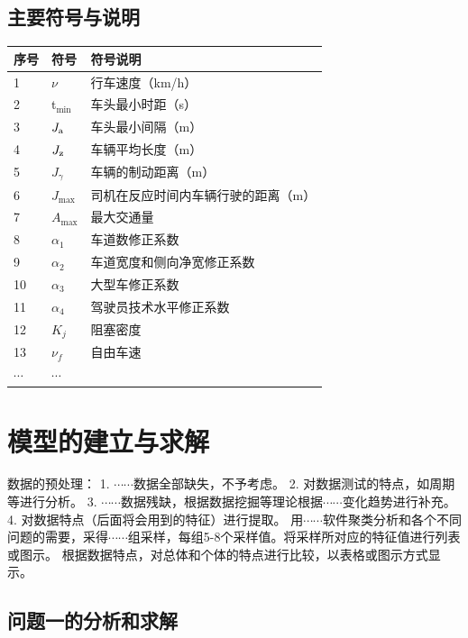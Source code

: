 \documentclass[a4paper]{nmmcm}
\newcommand{\headcol}{\rowcolor{tableheadcolor}}
\begin{document}
\subsection{主要符号与说明}

\begin{table}[h!]
  \centering
  \small
  \begin{tabular}{p{60pt}<{\centering}|p{60pt}<{\centering}p{180pt}<{\raggedright}}
   \hline
   \headcol 序号 & 符号 & 符号说明 \\
   \hline
    1 & $\nu$ & 行车速度（km/h） \\
    2 & t$_{\min}$ & 车头最小时距（s） \\
    3 & $J_{\rm a}$ & 车头最小间隔（m） \\
    4 & $J_{\rm z}$ & 车辆平均长度（m） \\
    5 & $J_{\gamma}$ & 车辆的制动距离（m） \\
    6 & $J_{\max}$ & 司机在反应时间内车辆行驶的距离（m） \\
    7 & $A_{\max}$ & 最大交通量 \\
    8 & $\alpha_{1}$ & 车道数修正系数 \\
    9 & $\alpha_{2}$ & 车道宽度和侧向净宽修正系数 \\
    10 & $\alpha_{3}$ & 大型车修正系数 \\
    11 & $\alpha_{4}$ & 驾驶员技术水平修正系数 \\
    12 & $K_{j}$ & 阻塞密度 \\
    13 & $\nu_{f}$ & 自由车速 \\
    $\cdots$ & $\cdots$\\
    \hline
  \end{tabular}
  \label{symbol}
\end{table}

\section{模型的建立与求解}

数据的预处理：
1. $\cdots\cdots$数据全部缺失，不予考虑。
2. 对数据测试的特点，如周期等进行分析。
3. $\cdots\cdots$数据残缺，根据数据挖掘等理论根据$\cdots\cdots$变化趋势进行补充。
4. 对数据特点（后面将会用到的特征）进行提取。
   用$\cdots\cdots$软件聚类分析和各个不同问题的需要，采得$\cdots\cdots$组采样，每组5-8个采样值。将采样所对应的特征值进行列表或图示。
根据数据特点，对总体和个体的特点进行比较，以表格或图示方式显示。


\subsection{问题一的分析和求解}
\end{document}
